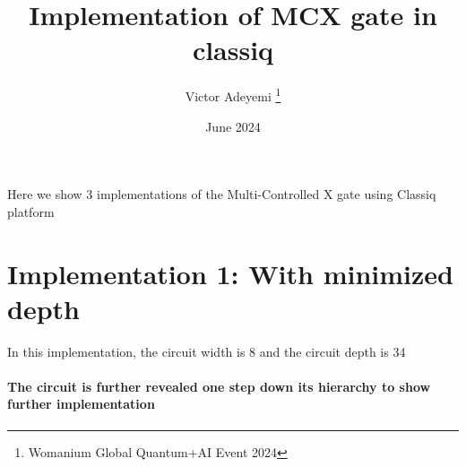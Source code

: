 \documentclass[12pt, letterpaper]{article}
\title{Implementation of MCX gate in classiq}
\author{Victor Adeyemi \thanks{Womanium Global Quantum+AI Event 2024}}
\date{June 2024}
\begin{document}
\maketitle
Here we show 3 implementations of the Multi-Controlled X gate using Classiq platform
\section{Implementation 1: With minimized depth}

In this implementation, the circuit width is 8 and the circuit depth is 34


\paragraph{
The circuit is further revealed one step down its hierarchy to show further implementation
}
\end{document}

